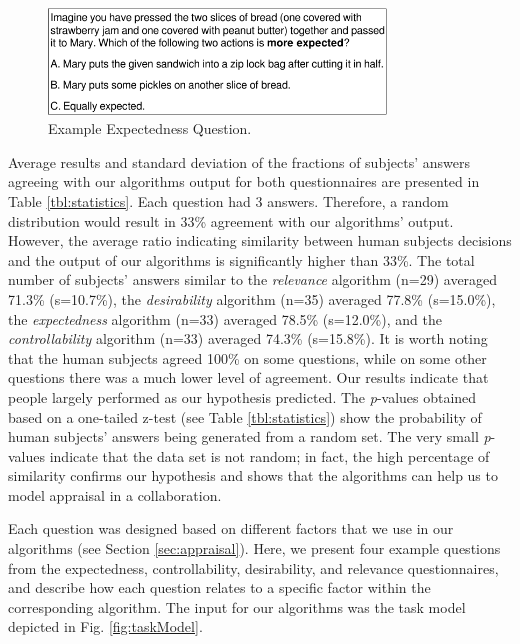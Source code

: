 \begin{figure}[tbh]
  \vspace{-1mm}
  \centering
  \includegraphics[width=0.8\textwidth]{figure/question-sample-croped.pdf}
  \caption{{\fontsize{9}{9}\selectfont Example Expectedness Question.}}
  \label{fig:qs1}
  \vspace{-2mm}
\end{figure}

Average results and standard deviation of the fractions of subjects' answers
agreeing with our algorithms output for both questionnaires are presented in
Table \ref{tbl:statistics}. Each question had 3 answers. Therefore, a random
distribution would result in 33\% agreement with our algorithms' output.
However, the average ratio indicating similarity between human subjects
decisions and the output of our algorithms is significantly higher than 33\%.
The total number of subjects' answers similar to the \textit{relevance}
algorithm (n=29) averaged 71.3\% (s=10.7\%), the \textit{desirability}
algorithm (n=35) averaged 77.8\% (s=15.0\%), the \textit{expectedness}
algorithm (n=33) averaged 78.5\% (s=12.0\%), and the \textit{controllability}
algorithm (n=33) averaged 74.3\% (s=15.8\%). It is worth noting that the human
subjects agreed 100\% on some questions, while on some other questions there
was a much lower level of agreement. Our results indicate that people largely
performed as our hypothesis predicted. The \textit{p}-values obtained based on a
one-tailed z-test (see Table \ref{tbl:statistics}) show the probability of human
subjects' answers being generated from a random set. The very small
\textit{p}-values indicate that the data set is not random; in fact, the high
percentage of similarity confirms our hypothesis and shows that the algorithms
can help us to model appraisal in a collaboration.

Each question was designed based on different factors that we use in our
algorithms (see Section \ref{sec:appraisal}). Here, we present four example
questions from the expectedness, controllability, desirability, and relevance
questionnaires, and describe how each question relates to a specific factor
within the corresponding algorithm. The input for our algorithms was the task
model depicted in Fig. \ref{fig:taskModel}.

